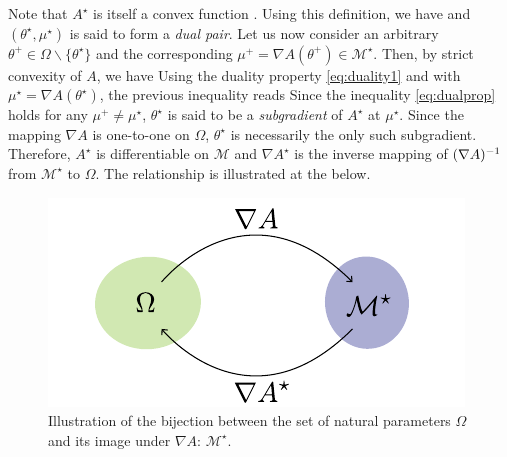 Note that $A^{\star}$ is itself a convex function \citep[Theorem 12.2]{rockafellar70}. Using this definition, we have
%
%
and $(\theta^{\star},\mu^{\star})$ is said to form a \emph{dual pair}. Let us now consider an arbitrary $\theta^{+}\in\Omega\backslash\{\theta^{\star}\}$ and the corresponding $\mu^{+}=\nabla A(\theta^{+})\in\mathcal M^{\star}$. Then, by strict convexity of $A$, we have
%
%
Using the duality property \eqref{eq:duality1} and with $\mu^{\star}=\nabla A(\theta^{\star})$, the previous inequality reads
%
%
Since the inequality \eqref{eq:dualprop} holds for any $\mu^{+}\neq \mu^{\star}$, $\theta^{\star}$ is said to be a \emph{subgradient} of $A^{\star}$ at $\mu^{\star}$. Since the mapping $\nabla A$ is one-to-one on $\Omega$, $\theta^{\star}$ is necessarily the only such subgradient. Therefore, $A^{\star}$ is differentiable on $\mathcal M$ \citep[theorem 25.1]{rockafellar70} and $\nabla A^{\star}$ is the inverse mapping of $(\nabla A)^{-1}$ from $\mathcal M^{\star}$ to $\Omega$. The relationship is illustrated at the  below.

\begin{figure}[!h]
	\center
	\includegraphics{figures/expf/mapping}
	\caption{\label{bijOmM}Illustration of the bijection between the set of natural parameters $\Omega$ and its image under $\nabla A$: $\mathcal M^{\star}$.}
\end{figure}
%
